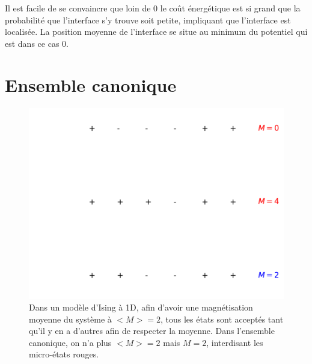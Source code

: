 Il est facile de se convaincre que loin de $0$ le coût énergétique est si grand que la probabilité que l'interface s'y trouve soit petite, impliquant que l'interface est localisée. La position moyenne de l'interface se situe au minimum du potentiel qui est dans ce cas $0$. 


	\section{Ensemble canonique}



\begin{figure}[h]
	\centering
	\includegraphics[scale=1]{isingtosos/figure-canonique.pdf}
	\caption{Dans un modèle d'Ising à 1D, afin d'avoir une magnétisation moyenne du système à $<M>=2$, tous les états sont acceptés tant qu'il y en a d'autres afin de respecter la moyenne. Dans l'ensemble canonique, on n'a plus $<M>=2$ mais $M=2$, interdisant les micro-états rouges.}
\end{figure}

